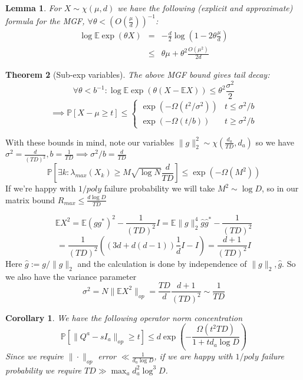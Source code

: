 \documentclass{article}
\newtheorem{theorem}{Theorem}
\newtheorem{corollary}{Corollary}
\newtheorem{lemma}[theorem]{Lemma}
\newcommand{\E}{\mathbb{E}}
\renewcommand{\Pr}{\mathbb{P}}
\begin{document}
\begin{lemma}
For $X \sim \chi(\mu,d)$ we have the following (explicit and approximate) formula for the MGF, $\forall \theta < \left(O(\frac{\mu}{d}) \right)^{-1}$:
\begin{eqnarray*} \log \E \exp(\theta X) & = & - \frac{d}{2} \log \left(1 - 2 \theta \frac{\mu}{d} \right) 
\\ & \leq & \theta \mu + \theta^{2} \frac{O(\mu^{2})}{2 d}
\end{eqnarray*}
\end{lemma}

\begin{theorem} [Sub-exp variables]
The above MGF bound gives tail decay:
\[ \forall \theta < b^{-1}: \log \E \exp(\theta (X - \E X)) \leq \theta^{2} \frac{\sigma^{2}}{2} \]
\[ \implies  \Pr[X - \mu \geq t] \leq \begin{cases}
\exp( - \Omega(t^{2}/\sigma^{2}) ) & t \leq \sigma^{2}/b
\\ \exp( - \Omega(t/b) ) & t \geq \sigma^{2}/b
\end{cases}   \]
\end{theorem}

With these bounds in mind, note our variables $\|g\|_{2}^{2} \sim \chi(\frac{d_{a}}{TD},d_{a})$ so we have $\sigma^{2} = \frac{d}{(TD)^{2}}, b = \frac{1}{TD} \implies \sigma^{2}/b = \frac{d}{TD}$
\[ \Pr[ \exists k: \lambda_{max}(X_{k}) \geq M \sqrt{\log N}\frac{d}{TD} ] \leq \exp( - \Omega(M^{2}) )  \]
If we're happy with $1/poly$ failure probability we will take $M^{2} \sim \log D$, so in our matrix bound $R_{max} \leq \frac{d \log D}{TD}$

\[ \E X^{2} = \E (g g^{*})^{2} - \frac{1}{(TD)^{2}} I = \E \|g\|_{2}^{4} \hat{g} \hat{g}^{*} - \frac{1}{(TD)^{2}} \]
\[ = \frac{1}{(TD)^{2}} ( (3d + d(d-1)) \frac{1}{d} I - I ) = \frac{d+1}{(TD)^{2}} I   \]
Here $\hat{g} := g / \|g\|_{2}$ and the calculation is done by independence of $\|g\|_{2}, \hat{g}$. So we also have the variance parameter
\[ \sigma^{2} = N \|\E X^{2}\|_{op} = \frac{TD}{d} \frac{d+1}{(TD)^{2}} \sim \frac{1}{TD}  \]

\begin{corollary}
We have the following operator norm concentration
\[ \Pr[ \|Q^{a} - sI_{a}\|_{op} \geq t ] \leq d \exp \left( - \frac{\Omega(t^{2} TD)}{1 + t d_{a} \log D }  \right)  \]
Since we require $\|\cdot\|_{op}$ error $\ll \frac{1}{d_{a} \log D}$, if we are happy with $1/poly$ failure probability we require $TD \gg \max_{a} d_{a}^{2} \log^{3} D$. 
\end{corollary}
\end{document}
